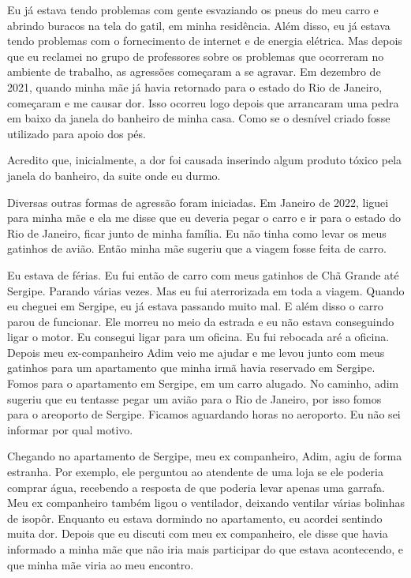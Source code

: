 \documentclass[11pt]{book}
\begin{document}
Eu já estava tendo problemas com gente esvaziando os pneus do meu carro e abrindo buracos na tela do gatil, em minha residência. Além disso, eu já estava tendo problemas com o fornecimento de internet e de energia elétrica. Mas depois que eu reclamei no grupo de professores sobre os problemas que ocorreram no ambiente de trabalho, as agressões começaram a se agravar. Em dezembro de 2021, quando minha mãe já havia retornado para o estado do Rio de Janeiro, começaram e me causar dor. Isso ocorreu logo depois que arrancaram uma pedra em baixo da janela do banheiro de minha casa. Como se o desnível criado fosse utilizado para apoio dos pés.

Acredito que, inicialmente, a dor foi causada inserindo algum produto tóxico pela janela do banheiro, da suite onde eu durmo. 

Diversas outras formas de agressão foram iniciadas. Em Janeiro de 2022, liguei para minha mãe e ela me disse que eu deveria pegar o carro e ir para o estado do Rio de Janeiro, ficar junto de minha família. Eu não tinha como levar os meus gatinhos de avião. Então minha mãe sugeriu que a viagem fosse feita de carro. 

Eu estava de férias. Eu fui então de carro com meus gatinhos de Chã Grande até Sergipe. Parando várias vezes. Mas eu fui aterrorizada em toda a viagem. Quando eu cheguei em Sergipe, eu já estava passando muito mal. E além disso o carro parou de funcionar. Ele morreu no meio da estrada e eu não estava conseguindo ligar o motor. Eu consegui ligar para um oficina. Eu fui rebocada aré a oficina. Depois meu ex-companheiro Adim veio me ajudar e me levou junto com meus gatinhos para um apartamento que minha irmã havia reservado em Sergipe. Fomos para o apartamento em Sergipe, em um carro alugado. No caminho, adim sugeriu que eu tentasse pegar um avião para o Rio de Janeiro, por isso fomos para o areoporto de Sergipe. Ficamos aguardando horas no aeroporto. Eu não sei informar por qual motivo. 

Chegando no apartamento de Sergipe, meu ex companheiro, Adim, agiu de forma estranha. Por exemplo, ele perguntou ao atendente de uma loja se ele poderia comprar água, recebendo a resposta de que poderia levar apenas uma garrafa. Meu ex companheiro também ligou o ventilador, deixando ventilar várias bolinhas de isopôr. Enquanto eu estava dormindo no apartamento, eu acordei sentindo muita dor. Depois que eu discuti com meu ex companheiro, ele disse que havia informado a minha mãe que não iria mais participar do que estava acontecendo, e que minha mãe viria ao meu encontro.
\end{document}
